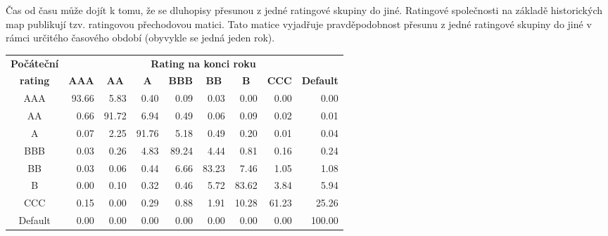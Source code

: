 \documentclass[a4paper]{book}
\begin{document}
Čas od času může dojít k tomu, že se dluhopisy přesunou z jedné ratingové skupiny do jiné. Ratingové společnosti na základě historických map publikují tzv. ratingovou přechodovou matici. Tato matice vyjadřuje pravděpodobnost přesunu z jedné ratingové skupiny do jiné v rámci určitého časového období (obyvykle se jedná jeden rok).

\begin{center}
\begin{tabular}{c r r r r r r r r}
\textbf{Počáteční} &
\multicolumn{8}{c}{\textbf{Rating na konci roku}} \\
\textbf{rating} &
\multicolumn{1}{c}{\textbf{AAA}} &
\multicolumn{1}{c}{\textbf{AA}} &
\multicolumn{1}{c}{\textbf{A}} &
\multicolumn{1}{c}{\textbf{BBB}} &
\multicolumn{1}{c}{\textbf{BB}} &
\multicolumn{1}{c}{\textbf{B}} &
\multicolumn{1}{c}{\textbf{CCC}} &
\multicolumn{1}{c}{\textbf{Default}} \\
\hline
AAA       & 93.66 &  5.83 &  0.40 &  0.09 &  0.03 &  0.00 &  0.00 &  0.00 \\
AA        &  0.66 & 91.72 &  6.94 &  0.49 &  0.06 &  0.09 &  0.02 &  0.01 \\
A         &  0.07 &  2.25 & 91.76 &  5.18 &  0.49 &  0.20 &  0.01 &  0.04 \\
BBB       &  0.03 &  0.26 &  4.83 & 89.24 &  4.44 &  0.81 &  0.16 &  0.24 \\
BB        &  0.03 &  0.06 &  0.44 &  6.66 & 83.23 &  7.46 &  1.05 &  1.08 \\
B         &  0.00 &  0.10 &  0.32 &  0.46 &  5.72 & 83.62 &  3.84 &  5.94 \\
CCC       &  0.15 &  0.00 &  0.29 &  0.88 &  1.91 & 10.28 & 61.23 &  25.26 \\
Default   &  0.00 &  0.00 &  0.00 &  0.00 &  0.00 &  0.00 &  0.00 & 100.00 \\
\hline
\end{tabular}
\end{center}
\end{document}

